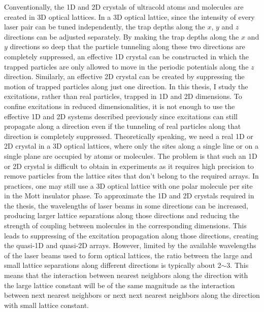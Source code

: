 Conventionally, the 1D and 2D crystals of ultracold atoms and molecules are created in 3D optical lattices. In a 3D 
optical lattice, since the intensity of every laser pair can be tuned independently, the trap depths along the $x$,
$y$ and $z$ directions can be adjusted separately. By making the trap depths along the $x$ and $y$ directions so deep
that the particle tunneling along these two directions are completely suppressed, an effective 1D crystal can be constructed
in which the trapped particles are only allowed to move in the periodic potentials along the $z$ direction. Similarly, an effective 2D crystal
can be created by suppressing the motion of trapped particles along just one direction. 
 In  this thesis, I study the excitations, rather than real particles,  trapped in 1D and 2D dimensions. 
To confine excitations in reduced dimensionalities, it is not enough to use the effective 1D and 2D systems described 
previously since excitations can still propagate along a direction even if the tunneling of real particles along that direction is 
completely suppressed. 
Theoretically speaking, we need a real 1D or 2D crystal in a 3D optical lattices, where only the sites along a single line 
or on a single plane are occupied by atoms or molecules. The problem is that such an 1D or 2D crystal is  difficult to obtain in experiments as it requires high precision to remove particles from the lattice sites that don't belong to the
required arrays. In practices, one may still use a 3D optical lattice with one polar molecule per site in the Mott insulator 
phase. To approximate the 1D and 2D crystals required in the thesis, the wavelengths of laser beams in some directions 
can be increased, producing larger lattice separations along those directions and reducing the strength of coupling between 
molecules in the corresponding dimensions. This leads to suppressing of the excitation propagation along those directions,
creating the quasi-1D and quasi-2D arrays. 
However, limited by the available wavelengths of the laser beams used to form optical lattices, the ratio between the large 
and small lattice separations along different directions is typically about 2$\sim$3. This means that the interaction 
between nearest neighbors along the direction with the large lattice constant will be of the same magnitude as the 
interaction between next nearest neighbors or next next nearest neighbors along the direction with small lattice constant.
